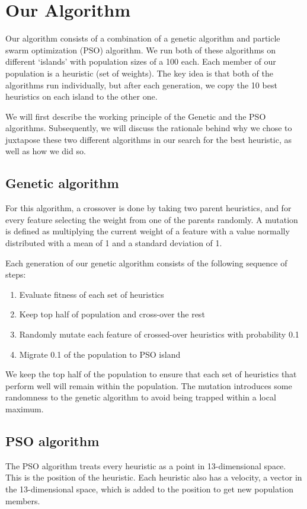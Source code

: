\documentclass{article}
\begin{document}
\section{Our Algorithm}

Our algorithm consists of a combination of a genetic algorithm and particle
swarm optimization (PSO) algorithm. We run both of these algorithms on
different ‘islands’ with population sizes of a 100 each. Each member of our
population is a heuristic (set of weights).  The key idea is that both of the
algorithms run individually, but after each generation, we copy the 10 best
heuristics on each island to the other one.

We will first describe the working principle of the Genetic and the PSO
algorithms. Subsequently, we will discuss the rationale behind why we chose to
juxtapose these two different algorithms in our search for the best heuristic,
as well as how we did so.

\subsection{Genetic algorithm}
For this algorithm, a crossover is done by taking two parent heuristics, and
for every feature selecting the weight from one of the parents randomly. A
mutation is defined as multiplying the current weight of a feature with a value
normally distributed with a mean of 1 and a standard deviation of 1.

Each generation of our genetic algorithm consists of the following sequence of
steps:
\begin{enumerate}
	\item Evaluate fitness of each set of heuristics
	\item Keep top half of population and cross-over the rest
	\item Randomly mutate each feature of crossed-over heuristics with
		probability 0.1
	\item Migrate 0.1 of the population to PSO island
\end{enumerate}
We keep the top half of the population to ensure that each set of heuristics
that perform well will remain within the population. The mutation introduces
some randomness to the genetic algorithm to avoid being trapped within a local
maximum.

\subsection{PSO algorithm}
The PSO algorithm treats every heuristic as a point in 13-dimensional space.
This is the position of the heuristic. Each heuristic also has a velocity,
a vector in the 13-dimensional space, which is added to the position to get
new population members.
\end{document}
